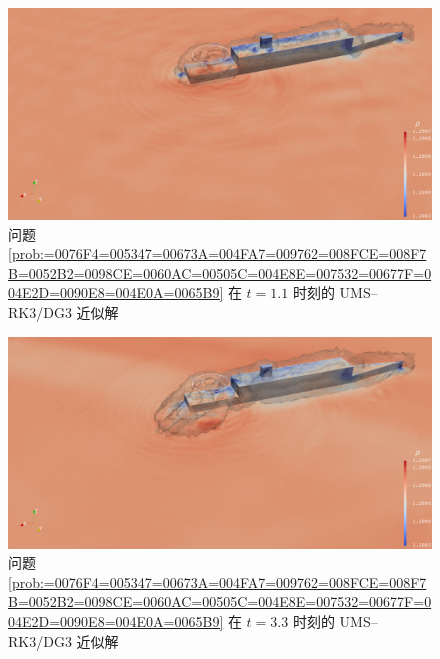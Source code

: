 \begin{figure}[h!]
\begin{centering}
\includegraphics[width=1\textwidth,height=0.28\textheight,keepaspectratio]{figures/ship/a=45_u=10/Frame11}
\par\end{centering}
\caption{\label{fig:ship_u=00003D10_a=00003D45_t=00003D11e-1}问题 \ref{prob:=0076F4=005347=00673A=004FA7=009762=008FCE=008F7B=0052B2=0098CE=0060AC=00505C=004E8E=007532=00677F=004E2D=0090E8=004E0A=0065B9}
在 $t=1.1$ 时刻的 UMS–RK3/DG3 近似解}
\end{figure}

\begin{figure}[h!]
\begin{centering}
\includegraphics[width=1\textwidth,height=0.28\textheight,keepaspectratio]{figures/ship/a=45_u=10/Frame33}
\par\end{centering}
\caption{\label{fig:ship_u=00003D10_a=00003D45_t=00003D33e-1}问题 \ref{prob:=0076F4=005347=00673A=004FA7=009762=008FCE=008F7B=0052B2=0098CE=0060AC=00505C=004E8E=007532=00677F=004E2D=0090E8=004E0A=0065B9}
在 $t=3.3$ 时刻的 UMS–RK3/DG3 近似解}
\end{figure}

